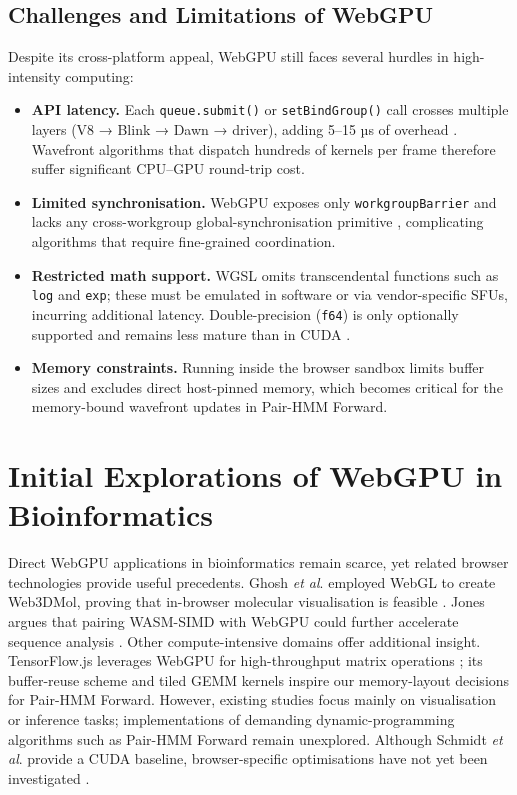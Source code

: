 \documentclass[PhD]{PHlab-thesis}
\begin{document}
\subsection{Challenges and Limitations of WebGPU}
Despite its cross-platform appeal, WebGPU still faces several hurdles in high-intensity computing:

\begin{itemize}
  \item \textbf{API latency.} Each \verb|queue.submit()| or \verb|setBindGroup()| call crosses multiple layers (V8 → Blink → Dawn → driver), adding 5–15 µs of overhead \cite{ChromeTeam2024-recap}. Wavefront algorithms that dispatch hundreds of kernels per frame therefore suffer significant CPU–GPU round-trip cost.
  \item \textbf{Limited synchronisation.} WebGPU exposes only \verb|workgroupBarrier| and lacks any cross-workgroup global-synchronisation primitive \cite{W3C2024-webgpu}, complicating algorithms that require fine-grained coordination.
  \item \textbf{Restricted math support.} WGSL omits transcendental functions such as \verb|log| and \verb|exp|; these must be emulated in software or via vendor-specific SFUs, incurring additional latency. Double-precision (\texttt{f64}) is only optionally supported and remains less mature than in CUDA \cite{Jones2023-toji}.
  \item \textbf{Memory constraints.} Running inside the browser sandbox limits buffer sizes and excludes direct host-pinned memory, which becomes critical for the memory-bound wavefront updates in Pair-HMM Forward.
\end{itemize}

\section{Initial Explorations of WebGPU in Bioinformatics}
Direct WebGPU applications in bioinformatics remain scarce, yet related browser technologies provide useful precedents. Ghosh \emph{et al}. employed WebGL to create Web3DMol, proving that in-browser molecular visualisation is feasible \cite{Ghosh2018}. Jones argues that pairing WASM-SIMD with WebGPU could further accelerate sequence analysis \cite{Jones2023-toji}.  
Other compute-intensive domains offer additional insight. TensorFlow.js leverages WebGPU for high-throughput matrix operations \cite{TensorFlowJS2024-webgpu}; its buffer-reuse scheme and tiled GEMM kernels inspire our memory-layout decisions for Pair-HMM Forward. However, existing studies focus mainly on visualisation or inference tasks; implementations of demanding dynamic-programming algorithms such as Pair-HMM Forward remain unexplored. Although Schmidt \emph{et al}. provide a CUDA baseline, browser-specific optimisations have not yet been investigated \cite{Schmidt2024-gpuPairHMM}.
\end{document}

